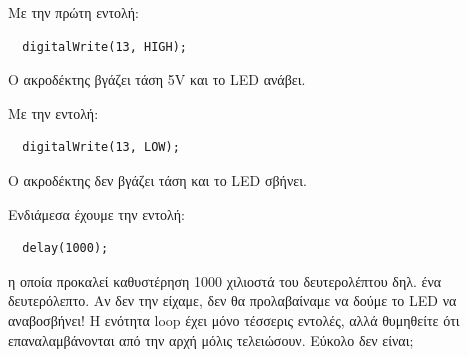 \documentclass[a4paper,twoside,12pt]{article}
\begin{document}
Με την πρώτη εντολή:

\begin{verbatim}
  digitalWrite(13, HIGH);   
\end{verbatim}

Ο ακροδέκτης βγάζει τάση 5V και το LED ανάβει.

Με την εντολή:

\begin{verbatim}
  digitalWrite(13, LOW);    
\end{verbatim}

O ακροδέκτης δεν βγάζει τάση και το LED σβήνει.

Ενδιάμεσα έχουμε την εντολή:

\begin{verbatim}
  delay(1000);
\end{verbatim}

η οποία προκαλεί καθυστέρηση 1000 χιλιοστά του δευτερολέπτου δηλ. ένα δευτερόλεπτο. Αν δεν την είχαμε, δεν θα προλαβαίναμε να δούμε το LED να αναβοσβήνει!  Η ενότητα loop έχει μόνο τέσσερις εντολές, αλλά θυμηθείτε ότι επαναλαμβάνονται από την αρχή μόλις τελειώσουν. Εύκολο δεν είναι;
\end{document}
